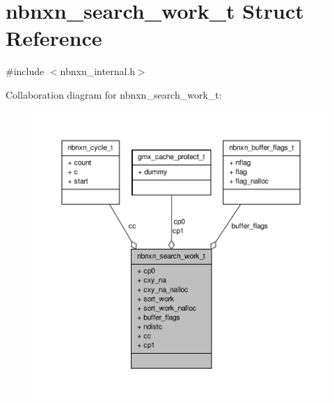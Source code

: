 \hypertarget{structnbnxn__search__work__t}{\section{nbnxn\-\_\-search\-\_\-work\-\_\-t \-Struct \-Reference}
\label{structnbnxn__search__work__t}
}


{\ttfamily \#include $<$nbnxn\-\_\-internal.\-h$>$}



\-Collaboration diagram for nbnxn\-\_\-search\-\_\-work\-\_\-t\-:
\nopagebreak
\begin{figure}[H]
\begin{center}
\leavevmode
\includegraphics[width=350pt]{structnbnxn__search__work__t__coll__graph}
\end{center}
\end{figure}
